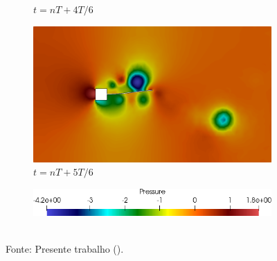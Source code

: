 \begin{figure}[h!]
\begin{subfigure}[b]{0.32\textwidth}
        \caption{$t=nT+4T/6$}
    \end{subfigure}
    \begin{subfigure}[b]{0.32\textwidth}
        \includegraphics[width=\linewidth]{Figuras/FSI-prism2/pT6.png}
        \caption{$t=nT+5T/6$}
    \end{subfigure}
    \begin{subfigure}[b]{0.49\textwidth}
        \includegraphics[width=\linewidth]{Figuras/FSI-prism2/pLegenda.png}
    \end{subfigure}
    \\Fonte: Presente trabalho (\the\year).
    \label{fig:prismPres2}
\end{figure}

